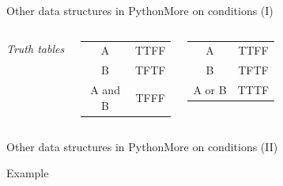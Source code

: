 \documentclass[10pt,compress]{beamer} %
\begin{document}
\begin{frame}{Other data structures in Python}{More on conditions (I)}
\begin{columns}
		\centering \textit{Truth tables}
		\smallskip
    	\begin{columns}
		\footnotesize{
		\centering \begin{tabular}{|c|c|}\hline
		A	   &TTFF \\
		B 	   &TFTF \\\hline
		A and B &TFFF \\\hline
		\end{tabular}
		}
		\footnotesize{
		\centering \begin{tabular}{|c|c|}\hline
		A	 &TTFF \\
		B 	 &TFTF \\\hline
		A or B &TTTF \\\hline
		\end{tabular}
		}
		\end{columns}
	\end{columns}
\end{frame}

\begin{frame}{Other data structures in Python}{More on conditions (II)}
	\begin{exampleblock}{Example}
		\vspace{-0.2cm}
		
		\vspace{-0.2cm}
	\end{exampleblock}
\end{frame}
\end{document}
